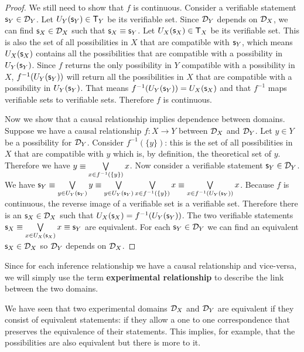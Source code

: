 \documentclass[11pt,letterpaper,fleqn]{memoir} %
\begin{document}
\begin{mathSection}
\begin{proof}
		We still need to show that $f$ is continuous. Consider a verifiable statement $\mathsf{s}_Y \in \mathcal{D}_Y$. Let $U_Y(\mathsf{s}_Y) \in \mathsf{T}_Y$ be its verifiable set. Since $\mathcal{D}_Y$ depends on $\mathcal{D}_X$, we can find $\mathsf{s}_X \in \mathcal{D}_X$ such that $\mathsf{s}_X \equiv \mathsf{s}_Y$. Let $U_X(\mathsf{s}_X) \in \mathsf{T}_X$ be its verifiable set. This is also the set of all possibilities in $X$ that are compatible with $\mathsf{s}_Y$, which means $U_X(\mathsf{s}_X)$ contains all the possibilities that are compatible with a possibility in $U_Y(\mathsf{s}_Y)$. Since $f$ returns the only possibility in $Y$ compatible with a possibility in $X$, $f^{-1}(U_Y(\mathsf{s}_Y))$ will return all the possibilities in $X$ that are compatible with a possibility in $U_Y(\mathsf{s}_Y)$. That means $f^{-1}(U_Y(\mathsf{s}_Y)) = U_X(\mathsf{s}_X)$ and that $f^{-1}$ maps verifiable sets to verifiable sets. Therefore $f$ is continuous.
		
		Now we show that a causal relationship implies dependence between domains. Suppose we have a causal relationship $f: X \to Y$ between $\mathcal{D}_X$ and $\mathcal{D}_Y$. Let $y \in Y$ be a possibility for $\mathcal{D}_Y$. Consider  $f^{-1}(\{y\})$: this is the set of all possibilities in $X$ that are compatible with $y$ which is, by definition, the theoretical set of $y$. Therefore we have $y \equiv \bigvee\limits_{x \in f^{-1}(\{y\})} x$. Now consider a verifiable statement $\mathsf{s}_Y \in \mathcal{D}_Y$. We have $\mathsf{s}_Y \equiv \bigvee\limits_{y \in U_Y(\mathsf{s}_Y)} y \equiv \bigvee\limits_{y \in U_Y(\mathsf{s}_Y)} \bigvee\limits_{x \in f^{-1}(\{y\})} x \equiv \bigvee\limits_{x \in f^{-1}(U_Y(\mathsf{s}_Y))} x$. Because $f$ is continuous, the reverse image of a verifiable set is a verifiable set. Therefore there is an $\mathsf{s}_X \in \mathcal{D}_X$ such that $U_X(\mathsf{s}_X) = f^{-1}(U_Y(\mathsf{s}_Y))$. The two verifiable statements $\mathsf{s}_X \equiv \bigvee\limits_{x \in U_X(\mathsf{s}_X)} x \equiv \mathsf{s}_Y$ are equivalent. For each $\mathsf{s}_Y \in \mathcal{D}_Y$ we can find an equivalent $\mathsf{s}_X \in \mathcal{D}_X$ so $\mathcal{D}_Y$ depends on $\mathcal{D}_X$.
	\end{proof}
\end{mathSection}

Since for each inference relationship we have a causal relationship and vice-versa, we will simply use the term \textbf{experimental relationship} to describe the link between the two domains.

We have seen that two experimental domains $\mathcal{D}_X$ and $\mathcal{D}_Y$ are equivalent if they consist of equivalent statements: if they allow a one to one correspondence that preserves the equivalence of their statements. This implies, for example, that the possibilities are also equivalent but there is more to it.
\end{document}
